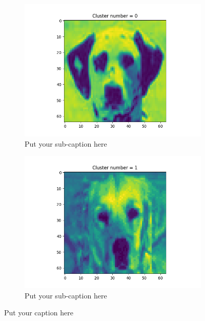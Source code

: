 \documentclass{article}
\begin{document}
\begin{figure}[H]
\begin{subfigure}{.33\textwidth}
  \centering
  \includegraphics[width=1\linewidth]{1d/Dogs/Example dog clust 1.png}  
  \caption{Put your sub-caption here}
  \label{fig:sub-first}
\end{subfigure}
\begin{subfigure}{.33\textwidth}
  \centering
  \includegraphics[width=1\linewidth]{1d/Dogs/Example dog clust 0.png}  
  \caption{Put your sub-caption here}
  \label{fig:sub-second}
\end{subfigure}
\caption{Put your caption here}
\label{example dog}
\end{figure}
\newpage
\end{document}
